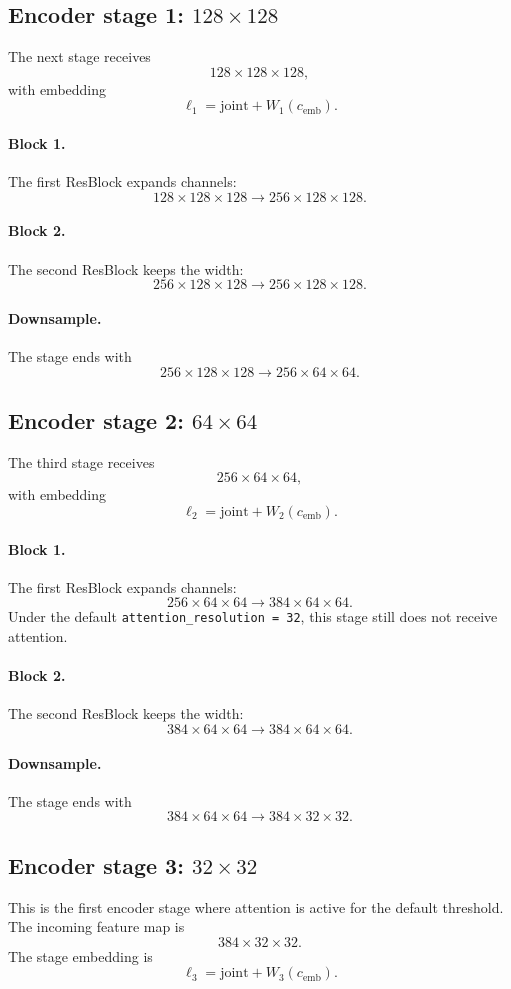 \documentclass[11pt]{article}
\begin{document}
\subsection{Encoder stage 1: $128 \times 128$}
The next stage receives
\[
128 \times 128 \times 128,
\]
with embedding
\[
\ell_1 = \mathrm{joint} + W_1(c_{\mathrm{emb}}).
\]
\paragraph{Block 1.}
The first ResBlock expands channels:
\[
128 \times 128 \times 128 \to 256 \times 128 \times 128.
\]
\paragraph{Block 2.}
The second ResBlock keeps the width:
\[
256 \times 128 \times 128 \to 256 \times 128 \times 128.
\]
\paragraph{Downsample.}
The stage ends with
\[
256 \times 128 \times 128 \to 256 \times 64 \times 64.
\]

\subsection{Encoder stage 2: $64 \times 64$}
The third stage receives
\[
256 \times 64 \times 64,
\]
with embedding
\[
\ell_2 = \mathrm{joint} + W_2(c_{\mathrm{emb}}).
\]
\paragraph{Block 1.}
The first ResBlock expands channels:
\[
256 \times 64 \times 64 \to 384 \times 64 \times 64.
\]
Under the default \texttt{attention\_resolution = 32}, this stage still does not receive attention.
\paragraph{Block 2.}
The second ResBlock keeps the width:
\[
384 \times 64 \times 64 \to 384 \times 64 \times 64.
\]
\paragraph{Downsample.}
The stage ends with
\[
384 \times 64 \times 64 \to 384 \times 32 \times 32.
\]

\subsection{Encoder stage 3: $32 \times 32$}
This is the first encoder stage where attention is active for the default threshold.
The incoming feature map is
\[
384 \times 32 \times 32.
\]
The stage embedding is
\[
\ell_3 = \mathrm{joint} + W_3(c_{\mathrm{emb}}).
\]
\end{document}
